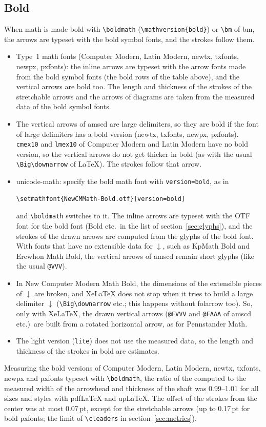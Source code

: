 \documentclass[dvipdfmx,a4paper]{article}
\newcommand\pkg[1]{\textsf{#1}}
\newcommand\file[1]{\texttt{#1}}
\begin{document}
\subsection{Bold}\label{sec:bold}
When math is made bold with \verb|\boldmath| (\verb|\mathversion{bold}|) or \verb|\bm| of
\pkg{bm}, the arrows are typeset with the bold symbol fonts, and the strokes follow them.
\begin{itemize}
\item Type~1 math fonts (Computer Modern, Latin Modern, \pkg{newtx}, \pkg{txfonts}, \pkg{newpx},
  \pkg{pxfonts}): the inline arrows are typeset with the arrow fonts made from the bold symbol
  fonts (the bold rows of the table above), and the vertical arrows are bold too. The length and
  thickness of the strokes of the stretchable arrows and the arrows of diagrams are taken from
  the measured data of the bold symbol fonts.
\item The vertical arrows of \pkg{amscd} are large delimiters, so they are bold if the font of
  large delimiters has a bold version (\pkg{newtx}, \pkg{txfonts}, \pkg{newpx}, \pkg{pxfonts}).
  \file{cmex10} and \file{lmex10} of Computer Modern and Latin Modern have no bold version, so
  the vertical arrows do not get thicker in bold (as with the usual \verb|\Big\downarrow| of
  \LaTeX). The strokes follow that arrow.
\item \pkg{unicode-math}: specify the bold math font with \verb|version=bold|, as in
\begin{Verbatim}
\setmathfont{NewCMMath-Bold.otf}[version=bold]
\end{Verbatim}
  and \verb|\boldmath| switches to it.
  The inline arrows are typeset with the OTF font for the bold font (Bold etc.\ in the list of
  section~\ref{sec:glyphs}), and the strokes of the drawn arrows are computed from the glyphs of
  the bold font. With fonts that have no extensible data for $\downarrow$, such as KpMath Bold
  and Erewhon Math Bold, the vertical arrows of \pkg{amscd} remain short glyphs (like the usual
  \verb|@VVV|).
\item In New Computer Modern Math Bold, the dimensions of the extensible pieces of $\downarrow$
  are broken, and Xe\LaTeX{} does not stop when it tries to build a large delimiter $\downarrow$
  (\verb|\Big\downarrow| etc.; this happens without \pkg{folarrow} too). So, only with
  Xe\LaTeX, the drawn vertical arrows (\verb|@FVVV| and \verb|@FAAA| of \pkg{amscd} etc.)\ are
  built from a rotated horizontal arrow, as for Pennstander Math.
\item The light version (\verb|lite|) does not use the measured data, so the length and
  thickness of the strokes in bold are estimates.
\end{itemize}
Measuring the bold versions of Computer Modern, Latin Modern, \pkg{newtx}, \pkg{txfonts},
\pkg{newpx} and \pkg{pxfonts} typeset with \verb|\boldmath|, the ratio of the computed to the
measured width of the arrowhead and thickness of the shaft was 0.99--1.01 for all sizes and
styles with pdf\LaTeX{} and up\LaTeX. The offset of the strokes from the center was at most
0.07\,pt, except for the stretchable arrows (up to 0.17\,pt for bold \pkg{pxfonts}; the limit of
\verb|\cleaders| in section~\ref{sec:metrics}).
\end{document}
